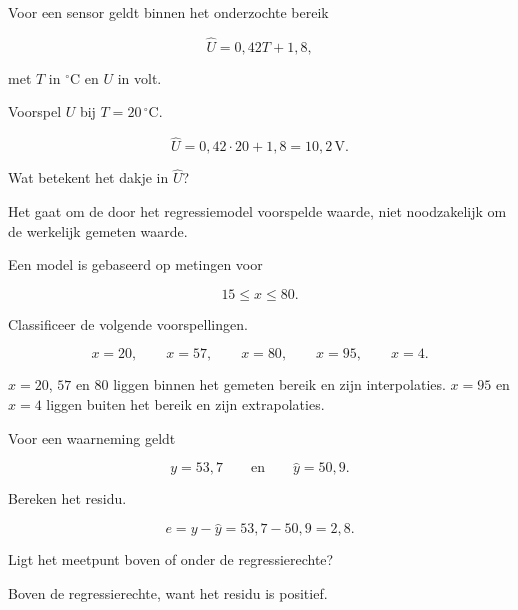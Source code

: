 \documentclass{ximera}
\begin{document}
\begin{oefening}{\oefB \ESS}

Voor een sensor geldt binnen het onderzochte bereik

\[
\hat U=0{,}42T+1{,}8,
\]

met $T$ in ${}^{\circ}\mathrm C$ en $U$ in volt.

\begin{question}
Voorspel $U$ bij $T=20\,{}^{\circ}\mathrm C$.

\begin{oplossing}
\[
\hat U=0{,}42\cdot20+1{,}8=10{,}2\,\mathrm V.
\]
\end{oplossing}
\end{question}

\begin{question}
Wat betekent het dakje in $\hat U$?

\begin{oplossing}
Het gaat om de door het regressiemodel voorspelde waarde, niet
noodzakelijk om de werkelijk gemeten waarde.
\end{oplossing}
\end{question}
\end{oefening}


\begin{oefening}{\oefB \ESS}

Een model is gebaseerd op metingen voor

\[
15\leq x\leq 80.
\]

Classificeer de volgende voorspellingen.

\[
x=20,\qquad x=57,\qquad x=80,\qquad x=95,\qquad x=4.
\]

\begin{oplossing}
$x=20$, $57$ en $80$ liggen binnen het gemeten bereik en zijn
interpolaties. $x=95$ en $x=4$ liggen buiten het bereik en zijn
extrapolaties.
\end{oplossing}
\end{oefening}


\begin{oefening}{\oefB}

Voor een waarneming geldt

\[
y=53{,}7
\qquad\text{en}\qquad
\hat y=50{,}9.
\]

\begin{question}
Bereken het residu.

\begin{oplossing}
\[
e=y-\hat y=53{,}7-50{,}9=2{,}8.
\]
\end{oplossing}
\end{question}

\begin{question}
Ligt het meetpunt boven of onder de regressierechte?

\begin{oplossing}
Boven de regressierechte, want het residu is positief.
\end{oplossing}
\end{question}
\end{oefening}
\end{document}
